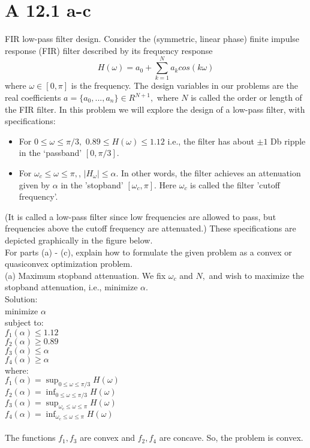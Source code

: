 \documentclass{article}
\begin{document}
\section*{A 12.1 a-c}
FIR low-pass filter design. Consider the (symmetric, linear phase) finite impulse response (FIR)
filter described by its frequency response
$$H(\omega) = a_0 + \sum_{k = 1}^{N} a_k cos(k \omega)$$
where $\omega \in [0, \pi]$ is the frequency. The design variables in our problems are the real coefficients 
$a = \{a_0, ... , a_n\} \in R^{N + 1},$ where $N$ is called the order or length of the FIR filter. In this problem we will explore the design of a low-pass filter, with specifications:\\
\begin{itemize}
	\item For $0 \leq \omega \leq \pi/3,$ 
	$0.89 \leq H(\omega) \leq 1.12$ i.e., the filter has about $\pm 1$ Db ripple in the `passband' $[0, \pi/3].$
	\item For $\omega_c \leq \omega \leq \pi,$, $|H_{\omega}| \leq \alpha.$ In other words, the filter achieves an attenuation given by $\alpha$ in the 'stopband' $[\omega_c, \pi].$ Here $\omega_c$ is called the filter 'cutoff frequency'.
	
\end{itemize}
(It is called a low-pass filter since low frequencies are allowed to pass, but frequencies above the cutoff frequency are attenuated.) These specifications are depicted graphically in the figure below.  \\
For parts (a) - (c), explain how to formulate the given problem as a convex or quasiconvex optimization problem.\\

(a) Maximum stopband attenuation. We fix $\omega_c$ and 
$N,$ and wish to maximize the stopband attenuation,
i.e., minimize $\alpha.$ \\

Solution:\\
minimize $\alpha$\\
subject to:\\
$f_1(\alpha) \leq 1.12$ \\
$f_2(\alpha) \geq 0.89$ \\
$f_3(\alpha) \leq \alpha$ \\
$f_4(\alpha) \geq \alpha$ \\
where:\\
$f_1(\alpha) = \sup_{0 \leq \omega \leq \pi/3} H(\omega) $\\
$f_2(\alpha) = \inf_{0 \leq \omega \leq \pi/3} H(\omega) $\\
$f_3(\alpha) = \sup_{\omega_c \leq \omega \leq \pi} H(\omega)$ \\
$f_4(\alpha) = \inf_{\omega_c \leq \omega \leq \pi} H(\omega)$ \\ \\
The functions $f_1, f_3$ are convex and $f_2, f_4$ are concave. So, the problem is convex.\\
\end{document}
